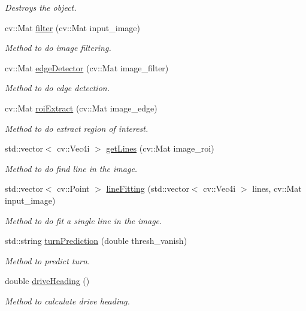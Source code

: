\begin{DoxyCompactItemize}
\begin{DoxyCompactList}\small\item\em Destroys the object. \end{DoxyCompactList}\item 
cv\+::\+Mat \hyperlink{class_lane_detection_a7c7413cec74ede4469eb090133887f9d}{filter} (cv\+::\+Mat input\+\_\+image)
\begin{DoxyCompactList}\small\item\em Method to do image filtering. \end{DoxyCompactList}\item 
cv\+::\+Mat \hyperlink{class_lane_detection_a89874335db28ff99b4b117dc4e21792f}{edge\+Detector} (cv\+::\+Mat image\+\_\+filter)
\begin{DoxyCompactList}\small\item\em Method to do edge detection. \end{DoxyCompactList}\item 
cv\+::\+Mat \hyperlink{class_lane_detection_af720e7949d6863e9d3e2100fc2655ce4}{roi\+Extract} (cv\+::\+Mat image\+\_\+edge)
\begin{DoxyCompactList}\small\item\em Method to do extract region of interest. \end{DoxyCompactList}\item 
std\+::vector$<$ cv\+::\+Vec4i $>$ \hyperlink{class_lane_detection_a3d2a00fcb2a6487d6cbd16c72768c4e4}{get\+Lines} (cv\+::\+Mat image\+\_\+roi)
\begin{DoxyCompactList}\small\item\em Method to do find line in the image. \end{DoxyCompactList}\item 
std\+::vector$<$ cv\+::\+Point $>$ \hyperlink{class_lane_detection_a58b5c9a016cbdad5fc2698492d157085}{line\+Fitting} (std\+::vector$<$ cv\+::\+Vec4i $>$ lines, cv\+::\+Mat input\+\_\+image)
\begin{DoxyCompactList}\small\item\em Method to do fit a single line in the image. \end{DoxyCompactList}\item 
std\+::string \hyperlink{class_lane_detection_ab3b0a639451e5056ff2d62d8ebd06fc9}{turn\+Prediction} (double thresh\+\_\+vanish)
\begin{DoxyCompactList}\small\item\em Method to predict turn. \end{DoxyCompactList}\item 
double \hyperlink{class_lane_detection_abd0c50facc187e7dc6c09c5325a5f013}{drive\+Heading} ()
\begin{DoxyCompactList}\small\item\em Method to calculate drive heading. \end{DoxyCompactList}\end{DoxyCompactItemize}


